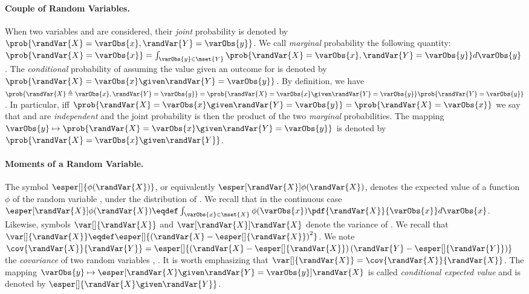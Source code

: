 \paragraph{Couple of Random Variables.}
When two variables  and  are considered, their \emph{joint} probability is denoted by \(\prob{\randVar{X} = \varObs{x}, \randVar{Y} = \varObs{y}}\).
We call \emph{marginal} probability the following quantity: \(\prob{\randVar{X} = \varObs{x}} = \int_{\varObs{y} \in \mset{Y}} \prob{\randVar{X} = \varObs{x}, \randVar{Y} = \varObs{y}} d\varObs{y}\).
The \emph{conditional} probability of  assuming the value  given an outcome  for  is denoted by \(\prob{\randVar{X} = \varObs{x} \given \randVar{Y} = \varObs{y}}\).
By definition, we have \(\prob{\randVar{X} \triangleq \varObs{x}, \randVar{Y} = \varObs{y}} = \prob{\randVar{X} = \varObs{x} \given \randVar{Y} = \varObs{y}} \prob{\randVar{Y} = \varObs{y}}\).
In particular, \gls{iff} \(\prob{\randVar{X} = \varObs{x} \given \randVar{Y} = \varObs{y}} = \prob{\randVar{X} = \varObs{x}}\) we say that  and  are \emph{independent} and the joint probability is then the product of the two \emph{marginal} probabilities.
The mapping \(\varObs{y} \mapsto \prob{\randVar{X} = \varObs{x} \given \randVar{Y} = \varObs{y}}\) is denoted by \(\prob{\randVar{X} = \varObs{x} \given \randVar{Y}}\).

\paragraph{Moments of a Random Variable.}
The symbol \(\esper[]{\phi(\randVar{X})}\), or equivalently \(\esper[\randVar{X}]{\phi(\randVar{X})}\), denotes the expected value of a function \(\phi\) of the random variable , under the distribution of .
We recall that in the continuous case \(\esper[\randVar{X}]{\phi(\randVar{X})} \eqdef \int_{\varObs{x} \in \mset{X}} \phi(\varObs{x})\pdf{\randVar{X}}{\varObs{x}} d\varObs{x}\).
Likewise, symbols \(\var[]{\randVar{X}}\) and \(\var[\randVar{X}]{\randVar{X}}\) denote the variance of .
We recall that \(\var[]{\randVar{X}} \eqdef \esper[]{\left(\randVar{X} - \esper[]{\randVar{X}}\right)^2}\).
We note \(\cov{\randVar{X}}{\randVar{Y}} = \esper[]{\left(\randVar{X} - \esper[]{\randVar{X}}\right)\left(\randVar{Y} - \esper[]{\randVar{Y}}\right)}\) the \emph{covariance} of two random variables , .
It is worth emphasizing that \(\var[]{\randVar{X}} = \cov{\randVar{X}}{\randVar{X}}\).
The mapping \(\varObs{y} \mapsto \esper[\randVar{X} \given \randVar{Y} = \varObs{y}]{\randVar{X}}\) is called \emph{conditional expected value} and is denoted by \(\esper[]{\randVar{X} \given \randVar{Y}}\).

